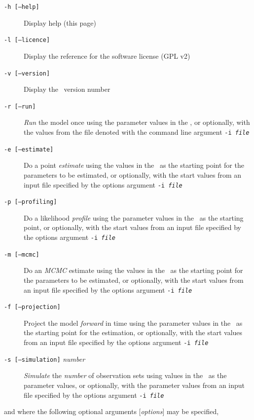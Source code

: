 \begin{description}
\item [\texttt{-h [--help]}] Display help (this page)
\item [\texttt{-l [--licence]}] Display the reference for the software license (GPL v2)
\item [\texttt{-v [--version]}] Display the \CNAME\ version number

\item [\texttt{-r [--run]}] \emph{Run} the model once using the parameter values in the \config, or optionally, with the values from the file denoted with the command line argument \texttt{-i \emph{file}}

\item [\texttt{-e [--estimate]}] Do a point \emph{estimate} using the values in the \config\ as the starting point for the parameters to be estimated, or optionally, with the start values from an input file specified by the options argument \texttt{-i \emph{file}}

\item [\texttt{-p [--profiling]}] Do a likelihood \emph{profile} using the parameter values in the \config\ as the starting point, or optionally, with the start values from an input file specified by the options argument \texttt{-i \emph{file}}

\item [\texttt{-m [--mcmc]}] Do an \emph{MCMC} estimate using the values in the \config\ as the starting point for the parameters to be estimated, or optionally, with the start values from an input file specified by the options argument \texttt{-i \emph{file}}

\item [\texttt{-f [--projection]}] Project the model \emph{forward} in time using the parameter values in the \config\ as the starting point for the estimation, or optionally,  with the start values from an input file specified by the options argument \texttt{-i \emph{file}}

\item [\texttt{-s [--simulation]} \emph{number}] \emph{Simulate} the \emph{number} of observation sets using values in the \config\ as the parameter values, or optionally, with the parameter values from an input file specified by the options argument \texttt{-i \emph{file}}
\end{description}

and where the following optional arguments [\emph{options}] may be specified,


